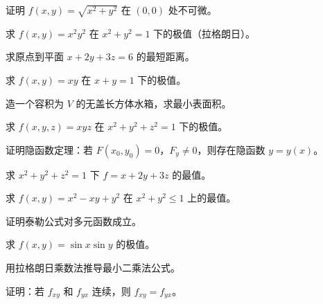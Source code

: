 \begin{exercise}[4] 证明 \(f(x,y)=\sqrt{x^2+y^2}\) 在 \((0,0)\) 处不可微。\end{exercise}
\begin{exercise}[4] 求 \(f(x,y)=x^2y^2\) 在 \(x^2+y^2=1\) 下的极值（拉格朗日）。\end{exercise}
\begin{exercise}[4] 求原点到平面 \(x+2y+3z=6\) 的最短距离。\end{exercise}
\begin{exercise}[4] 求 \(f(x,y)=xy\) 在 \(x+y=1\) 下的极值。\end{exercise}
\begin{exercise}[4] 造一个容积为 \(V\) 的无盖长方体水箱，求最小表面积。\end{exercise}
\begin{exercise}[5] 求 \(f(x,y,z)=xyz\) 在 \(x^2+y^2+z^2=1\) 下的极值。\end{exercise}
\begin{exercise}[5] 证明隐函数定理：若 \(F(x_0,y_0)=0\)，\(F_y\neq0\)，则存在隐函数 \(y=y(x)\)。\end{exercise}
\begin{exercise}[5] 求 \(x^2+y^2+z^2=1\) 下 \(f=x+2y+3z\) 的最值。\end{exercise}
\begin{exercise}[5] 求 \(f(x,y)=x^2-xy+y^2\) 在 \(x^2+y^2\le1\) 上的最值。\end{exercise}
\begin{exercise}[6] 证明泰勒公式对多元函数成立。\end{exercise}
\begin{exercise}[6] 求 \(f(x,y)=\sin x\sin y\) 的极值。\end{exercise}
\begin{exercise}[6] 用拉格朗日乘数法推导最小二乘法公式。\end{exercise}
\begin{exercise}[7] 证明：若 \(f_{xy}\) 和 \(f_{yx}\) 连续，则 \(f_{xy}=f_{yx}\)。\end{exercise}
